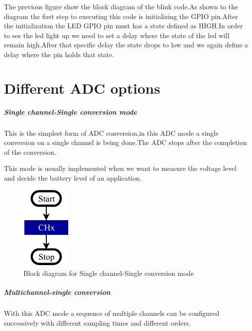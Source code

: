 \documentclass[a4paper, 11pt, openany, oneside]{book}
\begin{document}
\newpage
The previous figure show the block diagram of the blink code.As shown to the diagram the first step to executing this code is initializing the GPIO pin.After the initialization the LED GPIO pin must has a state defined as HIGH.In order to see the led light up we need to set a delay where the state of the led will remain high.After that specific delay the state drops to low and we again define a delay where the pin holds that state.

\chapter{Different ADC options}


\paragraph{Single channel-Single conversion mode}
This is the simplest form of ADC conversion,in this ADC mode a single conversion on a single channel is being done.The ADC stops after the completion of the conversion. \newline

This mode is usually implemented when we want to measure the voltage level and decide the battery level of an application.


\begin{figure}[b]
\centering
\includegraphics[width= 0.2\linewidth]{HS_STM32-single-channel-single-conversion-mode.pdf}
\caption{Block diagram for Single channel-Single conversion mode}
\end{figure}

\newpage
\paragraph{Multichannel-single conversion}



With this ADC mode a sequence of multiple channels can be configured successively  with different sampling times and different orders.
\end{document}
